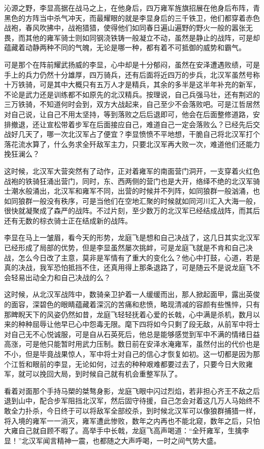 沁源之野，李显高据在战马之上，在他身后，四万雍军旌旗招展在他身后布阵，青黑色的方阵当中杀气冲天，而最耀眼的就是李显身后的三千铁卫，他们都穿着赤色战袍，春风吹拂中，战袍猎猎，使得他们如同春日遍山遍野的野火一般的嚣张无畏，而其他的雍军骑士则如同钢浇铁铸一般凝立不动，虽然是静止的战阵，可是却蕴藏着动静两种不同的气魄，无论是哪一种，都有着不可抵御的威势和霸气。

可是那个在阵前耀武扬威的李显，心中却是十分郁闷，虽然在安泽遭遇败绩，可是手上的兵力仍然十分雄厚，四万骑兵，还有后面将近四万的步兵，北汉军虽然号称十万铁骑，可是其中大概只有五万人才是精兵，其余的多半是这半年补充的新军，不论是武力还是训练都不如原先的北汉精兵。按理说，自己兵强马壮，还有荆迟的三万铁骑，不知道何时会到，双方大战起来，自己至少不会落败吧。可是江哲居然对自己说，让自己不用太坚持，等到落败之后后退即可，他会在后面整修道路，安排撤退，还让宣松带着步军在后面接应自己，难道自己一定会落败么？已经先后交战好几天了，哪一次北汉军占了便宜？李显愤愤不平地想，干脆自己将北汉军打个落花流水算了，什么务求全歼敌军主力，只要北汉军再大败一次，难道他们还能力挽狂澜么？

这时候，北汉军大营突然有了动作，正对着雍军的南面营门洞开，一支穿着火红色战袍的铁骑狂涌出营门，同时，东、西两侧的营门也是大开，络绎不绝的北汉军骑士潮水般涌出，北汉军和雍军不同，出营的时候并不列阵，如同狼群一般汹涌，也如同狼群一般没有秩序，可是当他们在空地汇聚的时候就如同河川汇入大海一般，很快就凝聚成了森严的战阵。不过片刻，至少数万的北汉军已经结成战阵，而其后还有无数的棕衣骑士正在结成新的战阵。

李显在马上一皱眉，看今天的形势，龙庭飞是想和自己决战了，这几日其实北汉军已经形成了局部的优势，但是李显虽然屡次挑衅，可是龙庭飞就是不肯和自己决战，怎么今日改了主意，莫非是军情有了重大的变化么？他心中打鼓，心道，若是真的决战，我军恐怕抵挡不住，还真用得上那条退路了，可是随云不是说龙庭飞不会轻易出动全力和自己决战的么？

这时候，从北汉军战阵中，数骑亲卫护着一人缓缓而出，那人掀起面甲，露出英俊的面容，深碧色的眼睛蕴藏着深沉的苦痛和悲愤，略现清减的容颜有些憔悴，只有那睥睨天下的风姿仍然如昔，龙庭飞轻轻抚着心爱的长戟，心中满是杀机，数月以来的种种屈辱让他早已心中怨毒无限。麾下四将如今只剩了段无敌，从前军中将士对自己无不心悦诚服，可是自从石英死后，他总是能够感觉到军中不满的情绪日益高涨，可是他只能暂时用武力压制。数日前在安泽水淹雍军，虽然付出的代价也是不小，但是毕竟战果惊人，军中将士对自己的信心才恢复如初。这一切都是因为那个江哲和眼前的李显，无论如何，过去的种种艰难都要过去了，只要今日大败雍军，就可以挽回大局，到时候自己就有机会重整军队了。

看着对面那个手持马槊的桀骜身影，龙庭飞眼中闪过烈焰，若非担心齐王不敌之后退到山中，配合步军阻挡北汉军，然后固守待援，自己怎会对着这几万人马始终不敢全力扑杀，今日终于可以将敌军全部绞杀，到时候北汉军可以像狼群捕猎一样，将入境的雍军一一消灭，雍军遭此惨败，数年之内再也不能北窥，数年之后，只怕大雍自己就自顾不暇了。高举手中长戟，龙庭飞高声喝道：“全歼雍军，生擒李显！”北汉军闻言精神一震，也都随之大声呼喝，一时之间气势大盛。

